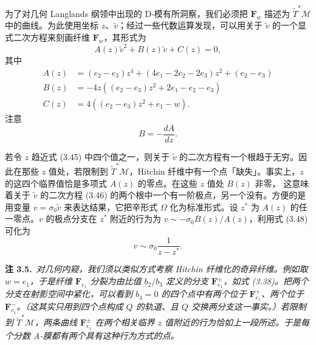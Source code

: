 \documentclass[11pt,a4paper]{article}
\begin{document}
为了对几何 Langlands 纲领中出现的 D-模有所洞察，我们必须把 $\boldsymbol{F}_w$ 描述为 $\tilde{T}^*\mathcal{M}$ 中的曲线。为此使用坐标 $z$、$\tilde v$；经过一些代数运算发现，可以用关于 $\tilde v$ 的一个显式二次方程来刻画纤维 $\boldsymbol{F}_w$，其形式为
\begin{equation}\tag{3.46}
A(z)\tilde v^2+B(z)\tilde v+C(z)=0,
\end{equation}
其中
\begin{equation}\tag{3.47}
\begin{aligned}
A(z)&=(e_2-e_3)z^4+(4e_1-2e_2-2e_3)z^2+(e_2-e_3)\\
B(z)&=-4z((e_2-e_3)z^2+2e_1-e_2-e_3)\\
C(z)&=4((e_2-e_3)z^2+e_1-w).
\end{aligned}
\end{equation}
注意
\begin{equation}\tag{3.48}
B=-\frac{dA}{dz}.
\end{equation}

若令 $z$ 趋近式 (3.45) 中四个值之一，则关于 $\tilde v$ 的二次方程有一个根趋于无穷。因此在那些 $z$ 值处，若限制到 $\tilde{T}^*\mathcal{M}$，Hitchin 纤维中有一个点「缺失」。事实上，$z$ 的这四个临界值恰是多项式 $A(z)$ 的零点。在这些 $z$ 值处 $B(z)$ 非零，
这意味着关于 $\tilde v$ 的二次方程 (3.46) 的两个根中一个有一阶极点，另一个没有。方便的是用变量 $v=\sigma_0\tilde v$ 来表达结果，它把辛形式 $\Omega$ 化为标准形式。设 $z^*$ 为 $A(z)$ 的任一零点。$v$ 的极点分支在 $z^*$ 附近的行为为 $v\sim-\sigma_0B(z)/A(z)$，利用式 (3.48) 可化为
\begin{equation}\tag{3.49}
v\sim\sigma_0\frac{1}{z-z^*}.
\end{equation}

\par\medskip
\noindent\textbf{注 3.5.}\ \textit{对几何内窥，我们须以类似方式考察 Hitchin 纤维化的奇异纤维。例如取 $w=e_1$，于是纤维 $\boldsymbol{F}_{e_1}$ 分裂为由比值 $b_2/b_3$ 定义的分支 $\boldsymbol{F}^\pm_{e_1}$，如式 (3.38)。把两个分支在射影空间中紧化，可以看到 $b_4=0$ 的四个点中有两个位于 $\boldsymbol{F}^+_{e_1}$、两个位于 $\boldsymbol{F}^-_{e_1}$。（这其实只用到四个点构成 $Q$ 的轨道、且 $Q$ 交换两分支这一事实。）若限制到 $\tilde{T}^*\mathcal{M}$，两条曲线 $\boldsymbol{F}^\pm_{e_1}$ 在两个相关临界 $z$ 值附近的行为恰如上一段所述。于是每个分数 A-膜都有两个具有这种行为方式的点。}
\par\medskip
\end{document}
